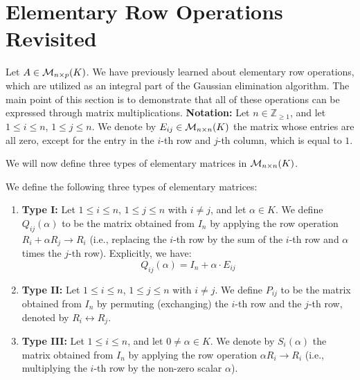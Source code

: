 \section{Elementary Row Operations Revisited}

Let $A \in \mathcal{M}_{n \times p}(K)$. We have previously learned about elementary row operations, which are utilized as an integral part of the Gaussian elimination algorithm. The main point of this section is to demonstrate that all of these operations can be expressed through matrix multiplications.
\textbf{Notation:} Let $n \in \mathbb{Z}_{\ge 1}$, and let $1 \le i \le n$, $1 \le j \le n$. We denote by $E_{ij} \in \mathcal{M}_{n \times n}(K)$ the matrix whose entries are all zero, except for the entry in the $i$-th row and $j$-th column, which is equal to $1$. 

We will now define three types of elementary matrices in $\mathcal{M}_{n \times n}(K)$.

\begin{definition}
\label{def:elementary_matrices}
We define the following three types of elementary matrices:
\begin{enumerate}
    \item \textbf{Type I:} Let $1 \le i \le n$, $1 \le j \le n$ with $i \neq j$, and let $\alpha \in K$. We define $Q_{ij}(\alpha)$ to be the matrix obtained from $I_n$ by applying the row operation $R_i + \alpha R_j \longrightarrow R_i$ (i.e., replacing the $i$-th row by the sum of the $i$-th row and $\alpha$ times the $j$-th row). Explicitly, we have:
    \begin{equation*}
        Q_{ij}(\alpha) = I_n + \alpha \cdot E_{ij}
    \end{equation*}
    
    \item \textbf{Type II:} Let $1 \le i \le n$, $1 \le j \le n$ with $i \neq j$. We define $P_{ij}$ to be the matrix obtained from $I_n$ by permuting (exchanging) the $i$-th row and the $j$-th row, denoted by $R_i \leftrightarrow R_j$.
    
    \item \textbf{Type III:} Let $1 \le i \le n$, and let $0 \neq \alpha \in K$. We denote by $S_i(\alpha)$ the matrix obtained from $I_n$ by applying the row operation $\alpha R_i \longrightarrow R_i$ (i.e., multiplying the $i$-th row by the non-zero scalar $\alpha$).
\end{enumerate}
\end{definition}

